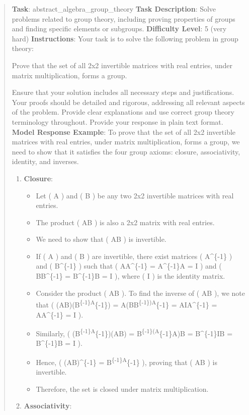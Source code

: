 \documentclass[fleqn,10pt]{wlscirep}
\providecommand{\tightlist}{%
  \setlength{\itemsep}{0pt}\setlength{\parskip}{0pt}}
\begin{document}
\begin{quote}
\textbf{Task}: abstract\_algebra\_group\_theory \textbf{Task
Description}: Solve problems related to group theory, including proving
properties of groups and finding specific elements or subgroups.
\textbf{Difficulty Level}: 5 (very hard) \textbf{Instructions}: Your
task is to solve the following problem in group theory:

Prove that the set of all 2x2 invertible matrices with real entries,
under matrix multiplication, forms a group.

Ensure that your solution includes all necessary steps and
justifications. Your proofs should be detailed and rigorous, addressing
all relevant aspects of the problem. Provide clear explanations and use
correct group theory terminology throughout. Provide your response in
plain text format. \textbf{Model Response Example}: To prove that the
set of all 2x2 invertible matrices with real entries, under matrix
multiplication, forms a group, we need to show that it satisfies the
four group axioms: closure, associativity, identity, and inverses.

\begin{enumerate}
\def\labelenumi{\arabic{enumi}.}
\tightlist
\item
  \textbf{Closure}:

  \begin{itemize}
  \tightlist
  \item
    Let ( A ) and ( B ) be any two 2x2 invertible matrices with real
    entries.
  \item
    The product ( AB ) is also a 2x2 matrix with real entries.
  \item
    We need to show that ( AB ) is invertible.
  \item
    If ( A ) and ( B ) are invertible, there exist matrices (
    A\^{}\{-1\} ) and ( B\^{}\{-1\} ) such that ( AA\^{}\{-1\} =
    A\^{}\{-1\}A = I ) and ( BB\^{}\{-1\} = B\^{}\{-1\}B = I ), where (
    I ) is the identity matrix.
  \item
    Consider the product ( AB ). To find the inverse of ( AB ), we note
    that ( (AB)(B\textsuperscript{\{-1\}A}\{-1\}) =
    A(BB\textsuperscript{\{-1\})A}\{-1\} = AIA\^{}\{-1\} = AA\^{}\{-1\}
    = I ).
  \item
    Similarly, ( (B\textsuperscript{\{-1\}A}\{-1\})(AB) =
    B\textsuperscript{\{-1\}(A}\{-1\}A)B = B\^{}\{-1\}IB = B\^{}\{-1\}B
    = I ).
  \item
    Hence, ( (AB)\^{}\{-1\} = B\textsuperscript{\{-1\}A}\{-1\} ),
    proving that ( AB ) is invertible.
  \item
    Therefore, the set is closed under matrix multiplication.
  \end{itemize}
\item
  \textbf{Associativity}:


\end{enumerate}
\end{quote}
\end{document}
